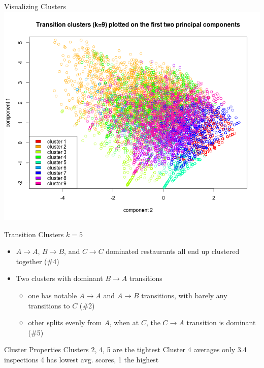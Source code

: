 \documentclass[12pt]{beamer}
\begin{document}
\begin{frame}{Visualizing Clusters}
\includegraphics[height=\textheight]{plots/trans_pca3}
\end{frame}

\begin{frame}{Transition Clusters}
\vfill
$k=5$
\begin{itemize}
	\item $A \rightarrow A$, $B \rightarrow B$, and $C \rightarrow C$ dominated
	restaurants all end up clustered together (\#4)
	\item Two clusters with dominant $B \rightarrow A$ transitions
	\begin{itemize}
		\item one has notable $A \rightarrow A$ and $A \rightarrow B$ transitions,
		with barely any transitions to $C$ (\#2)
		\item other splits evenly from $A$, when at $C$, the $C \rightarrow A$
		transition is dominant (\#5)
	\end{itemize}
\end{itemize}
\vfill
\end{frame}

\begin{frame}{Cluster Properties}
\vfill
Clusters 2, 4, 5 are the tightest
\vfill
Cluster 4 averages only 3.4 inspections
\vfill
4 has lowest avg. scores, 1 the highest
\vfill
\end{frame}
\end{document}
